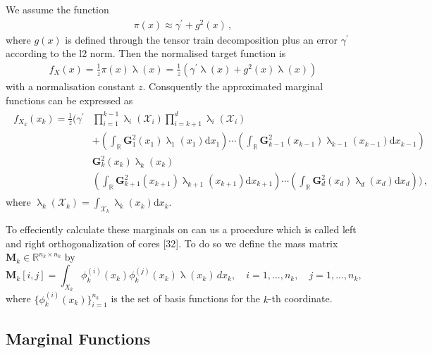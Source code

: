 We assume the function
\begin{align}
	\pi(x) \approx \gamma^{\prime} + g^2(x) \, ,
\end{align} 
where $g(x)$ is defined through the tensor train decomposition plus an error $\gamma^{\prime}$  according to the l2 norm.
Then the normalised target function is 
\begin{align}
	f_X(x) = \frac{1}{z} \pi(x) \uplambda(x) = \frac{1}{z} ( \gamma^{\prime} \uplambda(x) + g^2(x) \uplambda(x))
\end{align} 
with a normalisation constant $z$.
Consquently the approximated marginal functions can be expressed as
\begin{align}
	\begin{split}
		f_{X_k}(x_k) = \frac{1}{z}  \Bigg( \gamma^{\prime}& \prod_{i=1}^{k-1} \uplambda_i(\mathcal{X}_i) \prod_{i=k+1}^{d} \uplambda_i(\mathcal{X}_i) \\&+  \left( \int_{\mathbb{R}} \bm{G}^2_{1}(x_1) \uplambda_1(x_1)\text{d}x_{1} \right) \cdots \left( \int_{\mathbb{R}} \bm{G}^2_{k-1}(x_{k-1}) \uplambda_{k-1}(x_{k-1}) \text{d}x_{k-1} \right) \\ & \bm{G}^2_{k}(x_k)\uplambda_k(x_{k})\\ & \left( \int_{\mathbb{R}}  \bm{G}^2_{k+1}(x_{k+1})\uplambda_{k+1}(x_{k+1})\text{d}x_{k+1} \right) \cdots  \left( \int_{\mathbb{R}} \bm{G}^2_{d}(x_d)\uplambda_d(x_{d})\text{d}x_d \right) \Bigg) \, ,
	\end{split} 
\end{align}
where $\uplambda_k( \mathcal{X}_k) = \int_{ \mathcal{X}_k} \uplambda_k (x_k) \text{d}x_k$.

To effeciently calculate these marginals on can us a procedure which is called left and right orthogonalization of cores \cite{} [32].
To do so we define the mass matrix $\bm{M}_k \in \mathbb{R}^{n_k \times n_k}$ by
\begin{equation}
	\bm{M}_k[i, j] = \int_{X_k} \phi^{(i)}_k(x_k) \phi^{(j)}_k(x_k)  \uplambda(x_k) \,dx_k, \quad i = 1, ..., n_k, \quad j = 1, ..., n_k,
\end{equation}
where $\{\phi^{(i)}_k(x_k)\}_{i=1}^{n_k}$ is the set of basis functions for the $k$-th coordinate.




\subsection{Marginal Functions}

